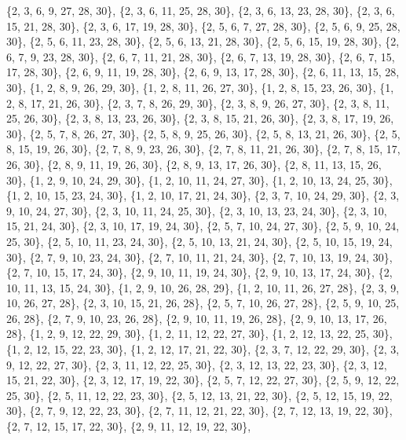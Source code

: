 \documentclass[11pt,a4paper]{article}
\begin{document}
{\{2, 3, 6, 9, 27, 28, 30\}, \{2, 3, 6, 11, 25, 28, 30\}, \{2, 3, 6, 13, 23, 28, 30\}, \{2, 3, 6, 15, 21, 28, 30\}, \{2, 3, 6, 17, 19, 28, 30\},
\{2, 5, 6, 7, 27, 28, 30\}, \{2, 5, 6, 9, 25, 28, 30\}, \{2, 5, 6, 11, 23, 28, 30\}, \{2, 5, 6, 13, 21, 28, 30\}, \{2, 5, 6, 15, 19, 28, 30\},
\{2, 6, 7, 9, 23, 28, 30\}, \{2, 6, 7, 11, 21, 28, 30\}, \{2, 6, 7, 13, 19, 28, 30\}, \{2, 6, 7, 15, 17, 28, 30\}, \{2, 6, 9, 11, 19, 28, 30\},
\{2, 6, 9, 13, 17, 28, 30\}, \{2, 6, 11, 13, 15, 28, 30\}, \{1, 2, 8, 9, 26, 29, 30\}, \{1, 2, 8, 11, 26, 27, 30\}, \{1, 2, 8, 15, 23, 26, 30\},
\{1, 2, 8, 17, 21, 26, 30\}, \{2, 3, 7, 8, 26, 29, 30\}, \{2, 3, 8, 9, 26, 27, 30\}, \{2, 3, 8, 11, 25, 26, 30\}, \{2, 3, 8, 13, 23, 26, 30\},
\{2, 3, 8, 15, 21, 26, 30\}, \{2, 3, 8, 17, 19, 26, 30\}, \{2, 5, 7, 8, 26, 27, 30\}, \{2, 5, 8, 9, 25, 26, 30\}, \{2, 5, 8, 13, 21, 26, 30\},
\{2, 5, 8, 15, 19, 26, 30\}, \{2, 7, 8, 9, 23, 26, 30\}, \{2, 7, 8, 11, 21, 26, 30\}, \{2, 7, 8, 15, 17, 26, 30\}, \{2, 8, 9, 11, 19, 26, 30\},
\{2, 8, 9, 13, 17, 26, 30\}, \{2, 8, 11, 13, 15, 26, 30\}, \{1, 2, 9, 10, 24, 29, 30\}, \{1, 2, 10, 11, 24, 27, 30\}, \{1, 2, 10, 13, 24, 25, 30\},
\{1, 2, 10, 15, 23, 24, 30\}, \{1, 2, 10, 17, 21, 24, 30\}, \{2, 3, 7, 10, 24, 29, 30\}, \{2, 3, 9, 10, 24, 27, 30\}, \{2, 3, 10, 11, 24, 25, 30\},
\{2, 3, 10, 13, 23, 24, 30\}, \{2, 3, 10, 15, 21, 24, 30\}, \{2, 3, 10, 17, 19, 24, 30\}, \{2, 5, 7, 10, 24, 27, 30\}, \{2, 5, 9, 10, 24, 25, 30\},
\{2, 5, 10, 11, 23, 24, 30\}, \{2, 5, 10, 13, 21, 24, 30\}, \{2, 5, 10, 15, 19, 24, 30\}, \{2, 7, 9, 10, 23, 24, 30\}, \{2, 7, 10, 11, 21, 24, 30\},
\{2, 7, 10, 13, 19, 24, 30\}, \{2, 7, 10, 15, 17, 24, 30\}, \{2, 9, 10, 11, 19, 24, 30\}, \{2, 9, 10, 13, 17, 24, 30\}, \{2, 10, 11, 13, 15, 24, 30\},
\{1, 2, 9, 10, 26, 28, 29\}, \{1, 2, 10, 11, 26, 27, 28\}, \{2, 3, 9, 10, 26, 27, 28\}, \{2, 3, 10, 15, 21, 26, 28\}, \{2, 5, 7, 10, 26, 27, 28\},
\{2, 5, 9, 10, 25, 26, 28\}, \{2, 7, 9, 10, 23, 26, 28\}, \{2, 9, 10, 11, 19, 26, 28\}, \{2, 9, 10, 13, 17, 26, 28\}, \{1, 2, 9, 12, 22, 29, 30\},
\{1, 2, 11, 12, 22, 27, 30\}, \{1, 2, 12, 13, 22, 25, 30\}, \{1, 2, 12, 15, 22, 23, 30\}, \{1, 2, 12, 17, 21, 22, 30\}, \{2, 3, 7, 12, 22, 29, 30\},
\{2, 3, 9, 12, 22, 27, 30\}, \{2, 3, 11, 12, 22, 25, 30\}, \{2, 3, 12, 13, 22, 23, 30\}, \{2, 3, 12, 15, 21, 22, 30\}, \{2, 3, 12, 17, 19, 22, 30\},
\{2, 5, 7, 12, 22, 27, 30\}, \{2, 5, 9, 12, 22, 25, 30\}, \{2, 5, 11, 12, 22, 23, 30\}, \{2, 5, 12, 13, 21, 22, 30\}, \{2, 5, 12, 15, 19, 22, 30\},
\{2, 7, 9, 12, 22, 23, 30\}, \{2, 7, 11, 12, 21, 22, 30\}, \{2, 7, 12, 13, 19, 22, 30\}, \{2, 7, 12, 15, 17, 22, 30\}, \{2, 9, 11, 12, 19, 22, 30\},
}
\end{document}
